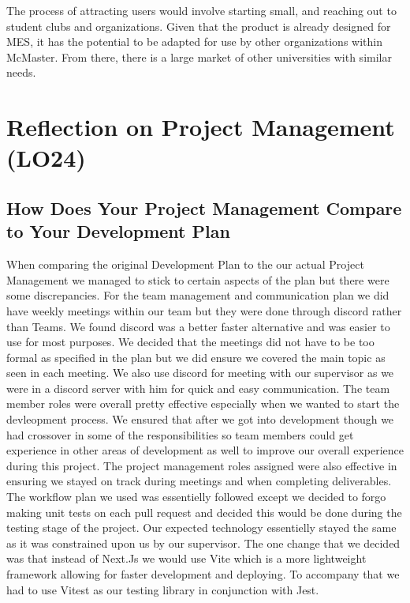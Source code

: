 \documentclass{article}
\begin{document}
The process of attracting users would involve starting small, and reaching out to student clubs and organizations. Given that the product is already designed for MES, it has the potential to be adapted for use by other organizations within McMaster. From there, there is a large market of other universities with similar needs.

\section{Reflection on Project Management (LO24)}
\subsection{How Does Your Project Management Compare to Your Development Plan}
When comparing the original Development Plan to the our actual Project Management we managed to stick to certain aspects of the plan but there were some discrepancies. \newline
\newline
For the team management and communication plan we did have weekly meetings within our team but they were done through discord rather than Teams. We found discord was a better faster alternative and was easier to use for most purposes. We decided that the meetings did not have to be too formal as specified in the plan but we did ensure we covered the main topic as seen in each meeting. We also use discord for meeting with our supervisor as we were in a discord server with him for quick and easy communication.
\newline\newline
The team member roles were overall pretty effective especially when we wanted to start the devleopment process. We ensured that after we got into development though we had crossover in some of the responsibilities so team members could get experience in other areas of development as well to improve our overall experience during this project. The project management roles assigned were also effective in ensuring we stayed on track during meetings and when completing deliverables.
\newline\newline
The workflow plan we used was essentielly followed except we decided to forgo making unit tests on each pull request and decided this would be done during the testing stage of the project.
\newline\newline
Our expected technology essentielly stayed the same as it was constrained upon us by our supervisor. The one change that we decided was that instead of Next.Js we would use Vite which is a more lightweight framework allowing for faster development and deploying. To accompany that we had to use Vitest as our testing library in conjunction with Jest.
\end{document}
